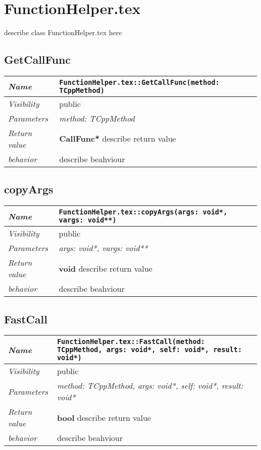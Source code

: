 \chapter{FunctionHelper.tex}
describe class FunctionHelper.tex here
\section{GetCallFunc}
\begin{longtable}{p{3cm} @{\hskip 1cm} p{12cm}}
 \hline
\textit{Name} & \texttt{FunctionHelper.tex::GetCallFunc(method: TCppMethod)}\\
\hline
 \textit{Visibility} & public\\
\hline
\textit{Parameters} & \textit{method: TCppMethod}\\
\hline
\textit{Return value} & \textbf{ CallFunc*} describe return value\\
  \hline
 \textit{behavior} & describe beahviour \\
\hline
\end{longtable} \pagebreak
 \section{copyArgs}
\begin{longtable}{p{3cm} @{\hskip 1cm} p{12cm}}
 \hline
\textit{Name} & \texttt{FunctionHelper.tex::copyArgs(args: void*, vargs: void**)}\\
\hline
 \textit{Visibility} & public\\
\hline
\textit{Parameters} & \textit{args: void*, vargs: void**}\\
\hline
\textit{Return value} & \textbf{ void} describe return value\\
  \hline
 \textit{behavior} & describe beahviour \\
\hline
\end{longtable} \pagebreak
 \section{FastCall}
\begin{longtable}{p{3cm} @{\hskip 1cm} p{12cm}}
 \hline
\textit{Name} & \texttt{FunctionHelper.tex::FastCall(method: TCppMethod, args: void*, self: void*, result: void*)}\\
\hline
 \textit{Visibility} & public\\
\hline
\textit{Parameters} & \textit{method: TCppMethod, args: void*, self: void*, result: void*}\\
\hline
\textit{Return value} & \textbf{ bool} describe return value\\
  \hline
 \textit{behavior} & describe beahviour \\
\hline
\end{longtable} \pagebreak
